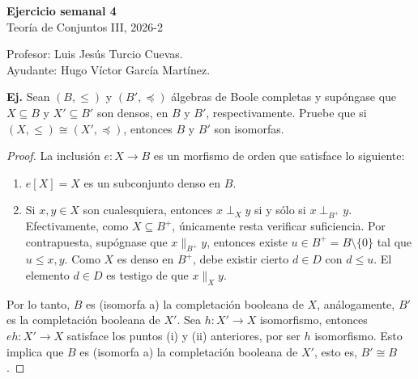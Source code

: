 \documentclass[letterpaper,DIV=15,12pt]{scrartcl}
\newcounter{Ejer}
\newcommand{\pts}{}
\newenvironment{ejercicio}[1]{\noindent
        \ifthenelse{\equal{#1}{1}}{\renewcommand{\pts}{\textbf{(#1 pt)}}}{\renewcommand{\pts}{\textbf{(#1 pts)}}}\textbf{Ej. \theEjer} \pts\stepcounter{Ejer}}{}
\begin{document}
\thispagestyle{plain}

       \begin{center}
            {\fontsize{30}{60}\rmfamily \textbf{Ejercicio semanal 4}} \\ \vspace{.2cm} Teoría de Conjuntos III, 2026-2
       \end{center}
        \begin{flushright}
            \footnotesize \hfill Profesor: Luis Jesús Turcio Cuevas.\\
            \hfill Ayudante: Hugo Víctor García Martínez.
        \end{flushright}
   
    \begin{ejercicio}{5}
        Sean $(B, \leq)$ y $(B', \preccurlyeq)$ álgebras de Boole completas y supóngase que $X \subseteq B$ y $X' \subseteq B'$ son densos, en $B$ y $B'$, respectivamente. Pruebe que si $(X,\leq) \cong (X',\preccurlyeq)$, entonces $B$ y $B'$ son isomorfas.
    \end{ejercicio}
    \begin{proof}
        La inclusión $e:X \to B$ es un morfismo de orden que satisface lo siguiente:
        \begin{enumerate}
            \item $e[X]=X$ es un subconjunto denso en $B$.
            \item Si $x,y \in X$ son cualesquiera, entonces $x \perp_X y$ si y sólo si $x \perp_{B^+} y$. Efectivamente, como $X \subseteq B^+$, únicamente resta verificar suficiencia. Por contrapuesta, supógnase que $x \parallel_{B^+} y$, entonces existe $u \in B ^+ = B \setminus \{0\}$ tal que $u \leq x,y$. Como $X$ es denso en $B^+$, debe existir cierto $d \in D$ con $d \leq u$. El elemento $d \in D $ es testigo de que $x \parallel_X y$.
        \end{enumerate}

        Por lo tanto, $B$ es (isomorfa a) la completación booleana de $X$, análogamente, $B'$ es la completación booleana de $X'$. Sea $h:X' \to X$ isomorfismo, entonces $eh:X' \to X$ satisface los puntos (i) y (ii) anteriores, por ser $h$ isomorfismo. Esto implica que $B$ es (isomorfa a) la completación booleana de $X'$, esto es, $B' \cong B$.
    \end{proof}
\end{document}
